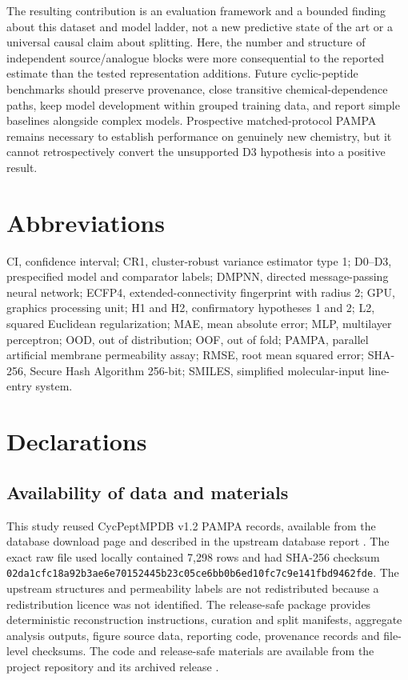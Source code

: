 \documentclass[referee,lineno,pdflatex,Numbered,sn-basic]{sn-jnl}
\begin{document}
The resulting contribution is an evaluation framework and a bounded finding about this dataset and model ladder, not a new predictive state of the art or a universal causal claim about splitting. Here, the number and structure of independent source/analogue blocks were more consequential to the reported estimate than the tested representation additions. Future cyclic-peptide benchmarks should preserve provenance, close transitive chemical-dependence paths, keep model development within grouped training data, and report simple baselines alongside complex models. Prospective matched-protocol PAMPA remains necessary to establish performance on genuinely new chemistry, but it cannot retrospectively convert the unsupported D3 hypothesis into a positive result.


\section*{Abbreviations}
CI, confidence interval; CR1, cluster-robust variance estimator type 1; D0--D3, prespecified model and comparator labels; DMPNN, directed message-passing neural network; ECFP4, extended-connectivity fingerprint with radius 2; GPU, graphics processing unit; H1 and H2, confirmatory hypotheses 1 and 2; L2, squared Euclidean regularization; MAE, mean absolute error; MLP, multilayer perceptron; OOD, out of distribution; OOF, out of fold; PAMPA, parallel artificial membrane permeability assay; RMSE, root mean squared error; SHA-256, Secure Hash Algorithm 256-bit; SMILES, simplified molecular-input line-entry system.

\backmatter

\section*{Declarations}

\subsection*{Availability of data and materials}
This study reused CycPeptMPDB v1.2 PAMPA records, available from the database download page \cite{cycpeptmpdb_download} and described in the upstream database report \cite{li2023cycpeptmpdb}. The exact raw file used locally contained 7,298 rows and had SHA-256 checksum \texttt{02da1cfc18a92b3ae6e70152445b23c05ce6bb0b6ed10fc7c9e141fbd9462fde}. The upstream structures and permeability labels are not redistributed because a redistribution licence was not identified. The release-safe package provides deterministic reconstruction instructions, curation and split manifests, aggregate analysis outputs, figure source data, reporting code, provenance records and file-level checksums. The code and release-safe materials are available from the project repository \cite{scaffoldseal_github} and its archived release \cite{scaffoldseal_zenodo}.
\end{document}
